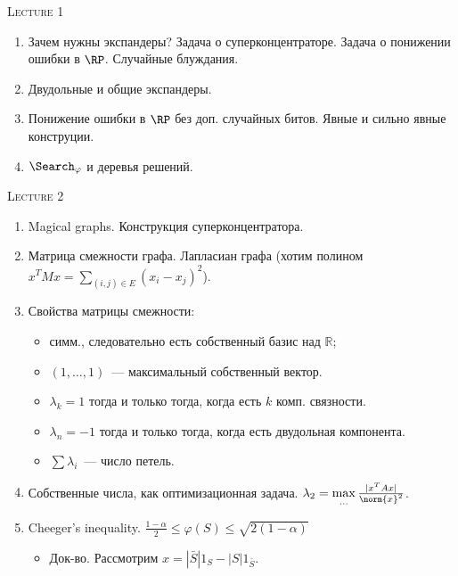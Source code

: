 \centerline{\textsc{Lecture 1}}

\begin{enumerate}
    \item Зачем нужны экспандеры? Задача о суперконцентраторе. Задача о понижении ошибки в
        $\RP$. Случайные блуждания.
    \item Двудольные и общие экспандеры.
    \item Понижение ошибки в $\RP$ без доп. случайных битов. Явные и сильно явные конструции.
    \item $\Search_{\varphi}$ и деревья решений.
\end{enumerate}


\centerline{\textsc{Lecture 2} }

\begin{enumerate}
    \item Magical graphs. Конструкция суперконцентратора.
    \item Матрица смежности графа. Лапласиан графа (хотим полином $x^T M x = \sum\limits_{(i, j) \in E}
        (x_i - x_j)^2$).
    \item Свойства матрицы смежности:
        \begin{itemize}
            \item симм., следовательно есть собственный базис над $\mathbb{R}$;
            \item $(1, \dots, 1)$~--- максимальный собственный вектор.
            \item $\lambda_k = 1$ тогда и только тогда, когда есть $k$ комп. связности.
            \item $\lambda_n = -1$ тогда и только тогда, когда есть двудольная компонента.
            \item $\sum \lambda_i$~--- число петель.
        \end{itemize}
    \item Собственные числа, как оптимизационная задача. $\lambda_2 = \max\limits_{...} \frac{|x^T A
        x|}{\norm{x}^2}$.
    \item Cheeger's inequality. $\frac{1 - \alpha}{2} \le \varphi(S) \le \sqrt{2 (1 - \alpha)}$
        \begin{itemize}
            \item Док-во. Рассмотрим $x = |\bar{S}| 1_S - |S| 1_{\bar{S}}$.
        \end{itemize}
\end{enumerate}

